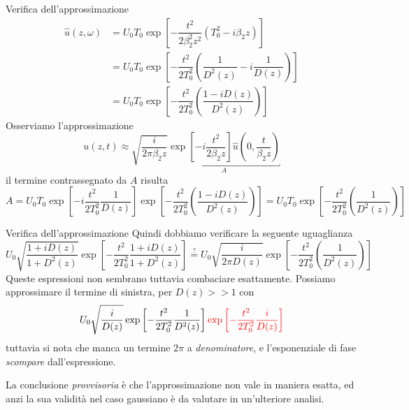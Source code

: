 \documentclass[8pt]{beamer} %
\begin{document}
\begin{frame}{Verifica dell'approssimazione}
    \begin{align*}
        \hat{u}(z, \omega) & = U_0 T_0 \exp\left[-\dfrac{t^2}{2\beta_2^2 z^2} (T_0^2 - i\beta_2z)\right]                       \\
                           & = U_0 T_0 \exp\left[-\dfrac{t^2}{2T_0^2} \left(\dfrac{1}{D^2(z)} - i\dfrac{1}{D(z)}\right)\right] \\
                           & = U_0 T_0 \exp\left[-\dfrac{t^2}{2T_0^2} \left(\dfrac{1-iD(z)}{D^2(z)}\right)\right]
    \end{align*}
    Osserviamo l'approssimazione
    \begin{equation}
        u(z, t) \approx \sqrt{\frac{i}{2\pi \beta_2 z}} \underbracket{\exp\left[-i\frac{t^2}{2 \beta_2 z}\right] \hat{u}\left(0, \frac{t}{\beta_2 z}\right)}_{A}
    \end{equation}
    il termine contrassegnato da $A$ risulta
    \begin{equation}
        A = U_0 T_0 \exp\left[-i\frac{t^2}{2 T_0^2} \dfrac{1}{D(z)}\right]\exp\left[-\dfrac{t^2}{2T_0^2} \left(\dfrac{1-iD(z)}{D^2(z)}\right)\right] = U_0 T_0 \exp\left[-\dfrac{t^2}{2T_0^2} \left(\dfrac{1}{D^2(z)}\right)\right]
    \end{equation}
\end{frame}

\begin{frame}{Verifica dell'approssimazione}
    Quindi dobbiamo verificare la seguente uguaglianza
    \begin{equation}
        U_0 \sqrt{\dfrac{1+iD(z)}{1+D^2(z)}} \exp\left[-\dfrac{t^2}{2T_0^2} \dfrac{1+iD(z)}{1+D^2(z)}\right]  \stackrel{?}{=}  U_0 \sqrt{\frac{i}{2\pi D(z)}} \exp\left[-\dfrac{t^2}{2T_0^2} \left(\dfrac{1}{D^2(z)}\right)\right]
    \end{equation}
    Queste espressioni non sembrano tuttavia combaciare esattamente. Possiamo approssimare il termine di sinistra, per $D(z)>>1$ con
    \begin{equation}
        U_0 \sqrt{\dfrac{i}{D(z)}} \exp\left[-\dfrac{t^2}{2T_0^2} \dfrac{1}{D^2(z)}\right] {\color{red} \exp\left[-\dfrac{t^2}{2T_0^2} \dfrac{i}{D(z)}\right]}
    \end{equation}
    tuttavia si nota che manca un termine $2\pi$ a \textit{denominatore}, e l'esponenziale di fase \textit{scompare} dall'espressione.

    \vspace{20pt}
    La conclusione \textit{provvisoria} è che l'approssimazione non vale in maniera esatta, ed anzi la sua validità nel caso gaussiano è da valutare in un'ulteriore analisi.
\end{frame}
\end{document}
